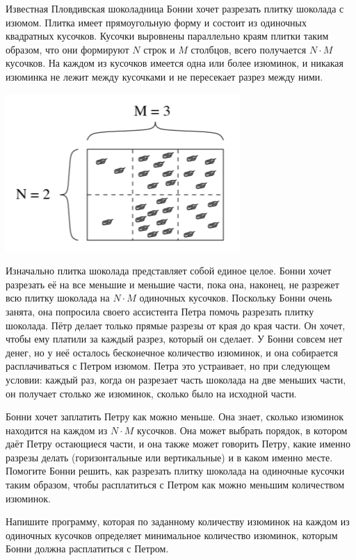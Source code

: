 Известная Пловдивская шоколадница Бонни хочет разрезать плитку шоколада с изюмом. Плитка имеет прямоугольную форму и состоит из одиночных квадратных кусочков. Кусочки выровнены параллельно краям плитки таким образом, что они формируют $N$ строк и $M$ столбцов, всего получается $N \cdot M$ кусочков. На каждом из кусочков имеется одна или более изюминок, и никакая изюминка не лежит между кусочками и не пересекает разрез между ними.

\includegraphics{raisins1.png}

Изначально плитка шоколада представляет собой единое целое. Бонни хочет разрезать её на все меньшие и меньшие части, пока она, наконец, не разрежет всю плитку шоколада на $N\cdot M$ одиночных кусочков. Поскольку Бонни очень занята, она попросила своего ассистента Петра помочь разрезать плитку шоколада. Пётр делает только прямые разрезы от края до края части. Он хочет, чтобы ему платили за каждый разрез, который он сделает. У Бонни совсем нет денег, но у неё осталось бесконечное количество изюминок, и она собирается расплачиваться с Петром изюмом. Петра это устраивает, но при следующем условии: каждый раз, когда он разрезает часть шоколада на две меньших части, он получает столько же изюминок, сколько было на исходной части. 

Бонни хочет заплатить Петру как можно меньше. Она знает, сколько изюминок находится на
каждом из $N\cdot M$ кусочков. Она может выбрать порядок, в котором даёт Петру остающиеся части, и она также может говорить Петру, какие именно разрезы делать (горизонтальные или
вертикальные) и в каком именно месте. Помогите Бонни решить, как разрезать плитку шоколада на одиночные кусочки таким образом, чтобы расплатиться с Петром как можно меньшим
количеством изюминок.

Напишите программу, которая по заданному количеству изюминок на каждом из одиночных
кусочков определяет минимальное количество изюминок, которым Бонни должна расплатиться с
Петром.